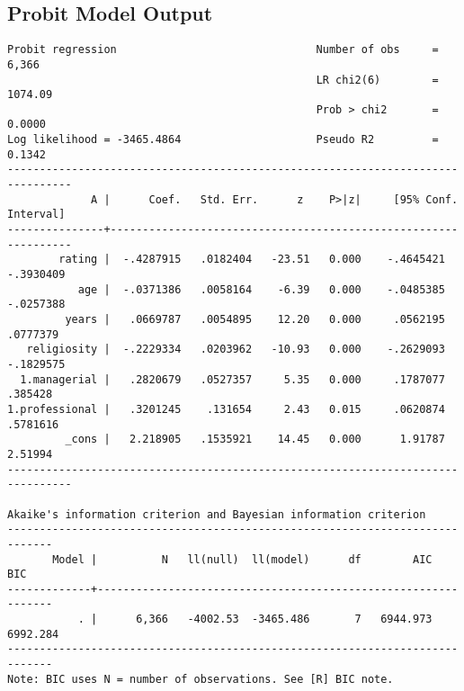 \documentclass{article}
\begin{document}
\hypertarget{probitoutput}{\subsection*{Probit Model Output}}
\begin{verbatim}
Probit regression                               Number of obs     =      6,366
                                                LR chi2(6)        =    1074.09
                                                Prob > chi2       =     0.0000
Log likelihood = -3465.4864                     Pseudo R2         =     0.1342
--------------------------------------------------------------------------------
             A |      Coef.   Std. Err.      z    P>|z|     [95% Conf. Interval]
---------------+----------------------------------------------------------------
        rating |  -.4287915   .0182404   -23.51   0.000    -.4645421   -.3930409
           age |  -.0371386   .0058164    -6.39   0.000    -.0485385   -.0257388
         years |   .0669787   .0054895    12.20   0.000     .0562195    .0777379
   religiosity |  -.2229334   .0203962   -10.93   0.000    -.2629093   -.1829575
  1.managerial |   .2820679   .0527357     5.35   0.000     .1787077     .385428
1.professional |   .3201245    .131654     2.43   0.015     .0620874    .5781616
         _cons |   2.218905   .1535921    14.45   0.000      1.91787     2.51994
--------------------------------------------------------------------------------

Akaike's information criterion and Bayesian information criterion
-----------------------------------------------------------------------------
       Model |          N   ll(null)  ll(model)      df        AIC        BIC
-------------+---------------------------------------------------------------
           . |      6,366   -4002.53  -3465.486       7   6944.973   6992.284
-----------------------------------------------------------------------------
Note: BIC uses N = number of observations. See [R] BIC note.
\end{verbatim}
\end{document}
